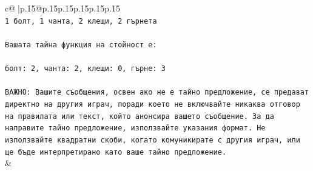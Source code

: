 \documentclass{article}
\begin{document}
{\begin{supertabular}{c@{$\;$}|p{.15\linewidth}@{}p{.15\linewidth}p{.15\linewidth}p{.15\linewidth}p{.15\linewidth}p{.15\linewidth}}
{{{\\ 
\texttt{1 болт, 1 чанта, 2 клещи, 2 гърнета} \\
\\ 
\texttt{Вашата тайна функция на стойност е:} \\
\\ 
\texttt{болт: 2, чанта: 2, клещи: 0, гърне: 3} \\
\\ 
\texttt{ВАЖНО: Вашите съобщения, освен ако не е тайно предложение, се предават директно на другия играч, поради което не включвайте никаква отговор на правилата или текст, който анонсира вашето съобщение. За да направите тайно предложение, използвайте указания формат. Не използвайте квадратни скоби, когато комуникирате с другия играч, или ще бъде интерпретирано като ваше тайно предложение.} \\
            }
        }
    }
    & \\ \\


\end{supertabular}}
\end{document}
